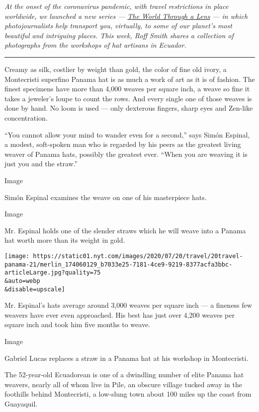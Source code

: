 \emph{At the onset of the coronavirus pandemic, with travel restrictions
in place worldwide, we launched a new series ---}
\href{https://www.nytimes.com/column/the-world-through-a-lens}{\emph{The
World Through a Lens}} \emph{--- in which photojournalists help
transport you, virtually, to some of our planet's most beautiful and
intriguing places. This week, Roff Smith shares a collection of
photographs from the workshops of hat artisans in Ecuador.}

\begin{center}\rule{0.5\linewidth}{\linethickness}\end{center}

Creamy as silk, costlier by weight than gold, the color of fine old
ivory, a Montecristi superfino Panama hat is as much a work of art as it
is of fashion. The finest specimens have more than 4,000 weaves per
square inch, a weave so fine it takes a jeweler's loupe to count the
rows. And every single one of those weaves is done by hand. No loom is
used --- only dexterous fingers, sharp eyes and Zen-like concentration.

``You cannot allow your mind to wander even for a second,'' says Simón
Espinal, a modest, soft-spoken man who is regarded by his peers as the
greatest living weaver of Panama hats, possibly the greatest ever.
``When you are weaving it is just you and the straw.''

Image

Simón Espinal examines the weave on one of his masterpiece hats.

Image

Mr. Espinal holds one of the slender straws which he will weave into a
Panama hat worth more than its weight in gold.

\texttt{[image: https://static01.nyt.com/images/2020/07/20/travel/20travel-panama-21/merlin\_174060129\_b7033e25-7181-4ce9-9219-8377acfa3bbc-articleLarge.jpg?quality=75\\\&auto=webp\\\&disable=upscale]}

Mr. Espinal's hats average around 3,000 weaves per square inch --- a
fineness few weavers have ever even approached. His best has just over
4,200 weaves per square inch and took him five months to weave.

Image

Gabriel Lucas replaces a straw in a Panama hat at his workshop in
Montecristi.

The 52-year-old Ecuadorean is one of a dwindling number of elite Panama
hat weavers, nearly all of whom live in Pile, an obscure village tucked
away in the foothills behind Montecristi, a low-slung town about 100
miles up the coast from Guayaquil.

